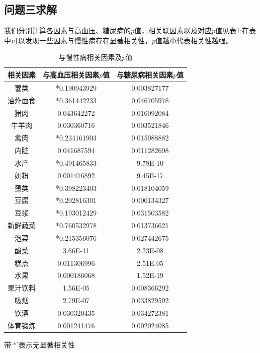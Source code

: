 \documentclass{cumcmthesis}
\begin{document}
\subsection{问题三求解}
我们分别计算各因素与高血压、糖尿病的$p$值，相关联因素以及对应$p$值见表\ref{bbb}:在表中可以发现一些因素与慢性病存在显著相关性，$p$值越小代表相关性越强。
\begin{table}[H]
\centering
\caption{与慢性病相关因素及$p$值
}
\label{bbb}\begin{threeparttable}
\begin{tabular}{ccc}
\hline
相关因素    & 与高血压相关因素$p$值       & 与糖尿病相关因素$p$值 \\ \hline
薯类      & *0.190943929 & 0.003827177  \\
油炸面食    & *0.361442233 & 0.046705978  \\
猪肉      & 0.043642272        & 0.016092084  \\
牛羊肉     & 0.030360716        & 0.003521846  \\
禽肉      & *0.234161903 & 0.015988882  \\
内脏      & 0.041687594        & 0.011282698  \\
水产      & *0.491465833 & 9.78E-10     \\
奶粉      & 0.001416892        & 9.45E-17     \\
蛋类      & *0.398223403 & 0.018104059  \\
豆腐      & *0.202816301 & 0.000134327  \\
豆浆      & *0.193012429 & 0.031503582  \\
新鲜蔬菜    & *0.760532978 & 0.013736621  \\
泡菜      & *0.215356076  & 0.027442675  \\
酸菜      & 3.66E-11           & 2.23E-08     \\
糕点      & 0.011306996        & 2.51E-05     \\
水果      & 0.000186068        & 1.52E-19     \\
果汁饮料    & 1.56E-05           & 0.008366292  \\
吸烟      & 2.79E-07           & 0.033829592  \\
饮酒      & 0.030320435        & 0.034272381  \\
体育锻炼 & 0.001241476        & 0.002024085  \\ \hline
\end{tabular}
\begin{tablenotes}    %
        \footnotesize               %
        \item[1] 带`*'表示无显著相关性
      \end{tablenotes}            %
    \end{threeparttable}       %
\end{table}
\end{document}
